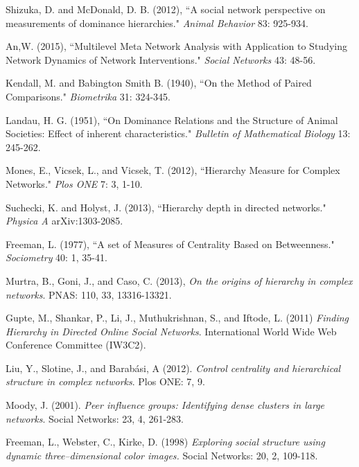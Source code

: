 \documentclass[3p,times]{elsarticle}
\begin{document}

\begin{thebibliography}{9}
	Shizuka, D. and McDonald, D. B. (2012),
	``A social network perspective on measurements of dominance hierarchies." 
	\textit{Animal Behavior} 83: 925-934.
	
	An,W. (2015),
	``Multilevel Meta Network Analysis with Application to Studying Network Dynamics of Network Interventions." \textit{Social Networks} 43: 48-56.
	
	Kendall, M. and Babington Smith B. (1940),
	``On the Method of Paired Comparisons." 
	\textit{Biometrika} 31: 324-345.
	
	Landau, H. G. (1951),
	``On Dominance Relations and the Structure of Animal Societies:  Effect of inherent characteristics." 
	\textit{Bulletin of Mathematical Biology} 13: 245-262.

	Mones, E., Vicsek, L., and Vicsek, T. (2012),
	``Hierarchy Measure for Complex Networks." 
	\textit{Plos ONE} 7: 3, 1-10.	
	
	Suchecki, K. and Holyst, J. (2013),
	``Hierarchy depth in directed networks." 
	\textit{Physica A} arXiv:1303-2085.
	
	Freeman, L. (1977),
	``A set of Measures of Centrality Based on Betweenness." 
	\textit{Sociometry} 40: 1, 35-41.
	
	
	
	
	
	Murtra, B., Goni, J., and Caso, C. (2013),
	\textit{On the origins of hierarchy in complex networks}. 
	PNAS: 110, 33, 13316-13321.
	
	Gupte, M., Shankar, P., Li, J., Muthukrishnan, S., and Iftode, L. (2011)
	\textit{Finding Hierarchy in Directed Online Social Networks}. 
	International World Wide Web Conference Committee (IW3C2).
			
	Liu, Y., Slotine, J., and Barab{\'a}si, A (2012).
	\textit{Control centrality and hierarchical structure in complex networks}.
	Plos ONE: 7, 9.
	
	Moody, J. (2001).
	\textit{Peer influence groups: Identifying dense clusters in large networks}.
	Social Networks: 23, 4, 261-283.
	
	Freeman, L., Webster, C., Kirke, D. (1998)
	\textit{Exploring social structure using dynamic three--dimensional color images.}
	Social Networks: 20, 2, 109-118.
	

\end{thebibliography}
\end{document}
